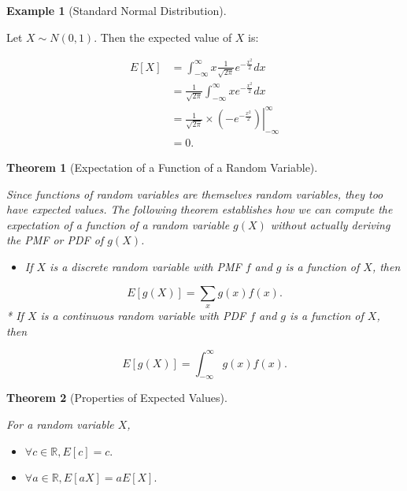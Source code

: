 \documentclass[
]{article}
\providecommand{\tightlist}{%
  \setlength{\itemsep}{0pt}\setlength{\parskip}{0pt}}
\newtheorem{theorem}{Theorem}[section]
\theoremstyle{definition}
\theoremstyle{definition}
\newtheorem{example}{Example}[section]
\theoremstyle{definition}
\theoremstyle{remark}
\begin{document}
\begin{example}[Standard Normal Distribution]
\protect\hypertarget{exm:unlabeled-div-57}{}\label{exm:unlabeled-div-57}

Let \(X \sim N(0,1)\). Then the expected value of \(X\) is:

\begin{align}
E[X] &= \int_{-\infty}^{\infty} x \frac{1}{\sqrt {2 \pi}}e^{- \frac{x^2}{2}}dx \\
     &= \frac{1}{\sqrt {2 \pi}} \int_{-\infty}^{\infty} x e^{- \frac{x^2}{2}}dx \\
     &= \left. \frac{1}{\sqrt {2 \pi}} \times (-e^{- \frac{x^2}{2}}) \right\vert_{-\infty}^{\infty} \\
     &= 0.
\end{align}

\end{example}

\begin{theorem}[Expectation of a Function of a Random Variable]
\protect\hypertarget{thm:unlabeled-div-58}{}\label{thm:unlabeled-div-58}

Since functions of random variables are themselves random variables, they too have expected values. The following theorem establishes how we can compute the expectation of a function of a random variable \(g(X)\) without actually deriving the PMF or PDF of \(g(X)\).

\begin{itemize}
\tightlist
\item
  If \(X\) is a discrete random variable with PMF \(f\) and \(g\) is a function of \(X\), then
\end{itemize}

\[E[g(X)] = \sum_xg(x)f(x).\]
* If \(X\) is a continuous random variable with PDF \(f\) and \(g\) is a function of \(X\), then

\[E[g(X)] = \int_{-\infty}^{\infty}g(x)f(x).\]

\end{theorem}

\begin{theorem}[Properties of Expected Values]
\protect\hypertarget{thm:unlabeled-div-59}{}\label{thm:unlabeled-div-59}

For a random variable \(X\),

\begin{itemize}
\tightlist
\item
  \(\forall c \in \mathbb{R}, E[c] = c.\)
\item
  \(\forall a \in \mathbb{R}, E[aX] = aE[X].\)
\end{itemize}

\end{theorem}
\end{document}
